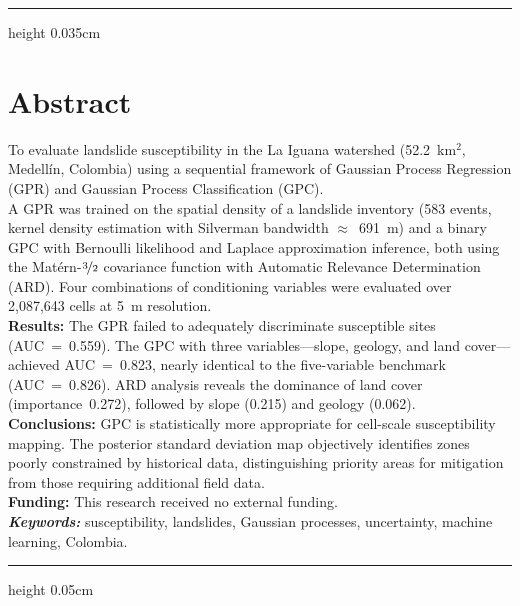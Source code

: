 \documentclass[letterpaper,11pt]{tec}
\begin{document}
{{\color{gray}\hrule height 0.035cm}




\vspace{0.1cm}

\section*{\color{black}Abstract}
 To evaluate landslide susceptibility in the La Iguana watershed
(52.2~km$^2$, Medellín, Colombia) using a sequential framework of Gaussian Process Regression (GPR)
and Gaussian Process Classification (GPC).
\\ A GPR was trained on the spatial density of a landslide inventory
(583 events, kernel density estimation with Silverman bandwidth $\approx$~691~m) and a binary GPC
with Bernoulli likelihood and Laplace approximation inference, both using the Matérn-$\nicefrac{3}{2}$
covariance function with Automatic Relevance Determination (ARD). Four combinations of conditioning
variables were evaluated over 2,087,643 cells at 5~m resolution.
\\\noindent\textbf{Results:} The GPR failed to adequately discriminate susceptible sites (AUC~=~0.559).
The GPC with three variables---slope, geology, and land cover---achieved AUC~=~0.823, nearly identical
to the five-variable benchmark (AUC~=~0.826). ARD analysis reveals the dominance of land cover
(importance~0.272), followed by slope (0.215) and geology (0.062).
\\\noindent\textbf{Conclusions:} GPC is statistically more appropriate for cell-scale susceptibility mapping.
The posterior standard deviation map objectively identifies zones poorly constrained by historical data,
distinguishing priority areas for mitigation from those requiring additional field data.
\\\noindent\textbf{Funding:} This research received no external funding.
\\

\noindent\textbf{\textit{Keywords:}} susceptibility, landslides, Gaussian processes, uncertainty, machine learning, Colombia.


{\color{gray}\hrule height 0.05cm}\vspace{0.3cm}
\newpage

\pagestyle{fancy}
\fancyhf{}
\fancyhead[C]{}

}
\end{document}
